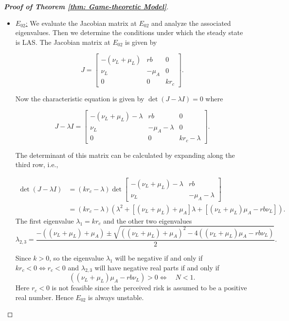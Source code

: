 \documentclass[10pt,a4paper]{amsart}
\begin{document}
\begin{proof}[\textbf{Proof of Theorem \ref{thm: Game-theoretic Model}}]
\begin{itemize}
 \item \underline{$E_{02}$:}  We evaluate the Jacobian matrix at $E_{02}$ and analyze the associated eigenvalues. Then we determine the conditions under which the steady state is LAS. The Jacobian matrix at $E_{02}$ is given by


\[
J = \begin{bmatrix}
-(\nu_L + \mu_L) & r b & 0 \\
\nu_L & -\mu_A & 0 \\
0 & 0 & k r_c
\end{bmatrix}.
\]

Now the characteristic equation is given by \(\det(J - \lambda I) = 0\) where 

\[
J - \lambda I = \begin{bmatrix}
-(\nu_L + \mu_L) - \lambda & r b & 0 \\
\nu_L & -\mu_A - \lambda & 0 \\
0 & 0 & k r_c - \lambda
\end{bmatrix}.
\]

The determinant of this matrix can be calculated by expanding along the third row, i.e., 

$$
\begin{aligned}
\operatorname{det}(J-\lambda I) & =\left(k r_c-\lambda\right) \operatorname{det}\left[\begin{array}{cc}
-\left(\nu_L+\mu_L\right)-\lambda & r b \\
\nu_L & -\mu_A-\lambda
\end{array}\right] \\
& =\left(k r_c-\lambda\right)\left(\lambda^2+\left[\left(\nu_L+\mu_L\right)+\mu_A\right] \lambda+\left[\left(\nu_L+\mu_L\right) \mu_A-r b \nu_L\right]\right).
\end{aligned}
$$
The first eigenvalue \(\lambda_1 = k r_c\) and the other two eigenvalues 
$$
\lambda_{2,3} = \frac{-\left((\nu_L + \mu_L) + \mu_A\right) \pm \sqrt{\left((\nu_L + \mu_L) + \mu_A\right)^2 - 4\left((\nu_L + \mu_L) \mu_A - r b \nu_L\right)}}{2}.$$
 
Since $k>0$, so the eigenvalue \(\lambda_1\) will be negative if and only if \(k r_c < 0 \Leftrightarrow  r_c < 0
\) and \(\lambda_{2,3}\) will have negative real parts if and only if $$
\left(\left(\nu_L+\mu_L\right) \mu_A-r b \nu_L\right)>0 
 \Leftrightarrow \quad {N}<1.
$$
Here $r_c < 0$ is not feasible since the perceived risk is assumed to be a positive real number. Hence $E_{02}$ is always unstable.





\end{itemize}
\end{proof}
\end{document}
